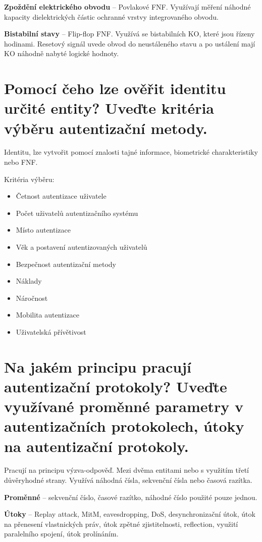 \textbf{Zpoždění elektrického obvodu} -- Povlakové FNF. Využívají měření náhodné kapacity dielektrických částic ochranné vrstvy integrovaného obvodu. 

\textbf{Bistabilní stavy} -- Flip-flop FNF. Využívá se bistabilních KO, které jsou řízeny hodinami. Resetový signál uvede obvod do neustáleného stavu a po ustálení mají KO náhodně nabyté logické hodnoty.

\section{Pomocí čeho lze ověřit identitu určité entity? Uveďte kritéria výběru autentizační metody.}

Identitu, lze vytvořit pomocí znalosti tajné informace, biometrické charakteristiky nebo FNF.

Kritéria výběru:
\begin{itemize}
    \item Četnost autentizace uživatele
    \item Počet uživatelů autentizačního systému
    \item Místo autentizace
    \item Věk a postavení autentizovaných uživatelů
    \item Bezpečnost autentizační metody
    \item Náklady
    \item Náročnost
    \item Mobilita autentizace
    \item Uživatelská přívětivost
\end{itemize}

\section{Na jakém principu pracují autentizační protokoly? Uveďte využívané proměnné parametry v autentizačních protokolech, útoky na autentizační protokoly.}

Pracují na principu výzva-odpověď. Mezi dvěma entitami nebo s využitím třetí důvěryhodné strany. Využívá náhodná čísla, sekvenční čísla nebo časová razítka.

\textbf{Proměnné} -- sekvenční číslo, časové razítko, náhodné číslo použité pouze jednou.

\textbf{Útoky} -- Replay attack, MitM, eavesdropping, DoS, desynchronizační útok, útok na přenesení vlastnických práv, útok zpětné zjistitelnosti, reflection, využití paralelního spojení, útok prolínáním.

